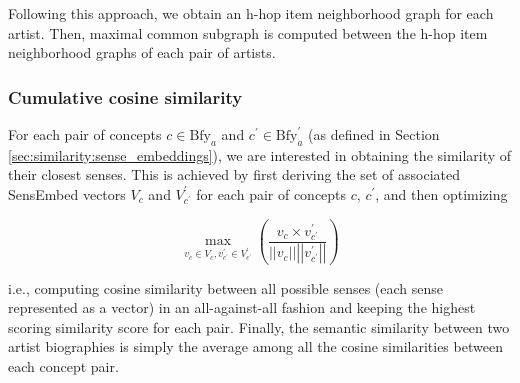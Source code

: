 Following this approach, we obtain an h-hop item neighborhood graph for each artist. Then, maximal common subgraph is computed between the h-hop item neighborhood graphs of each pair of artists. %

\subsubsection{Cumulative cosine similarity} %

For each pair of concepts $c \in \text{Bfy}_{a}$ and $c^{\prime} \in \text{Bfy}^{\prime}_{a}$ (as defined in Section \ref{sec:similarity:sense_embeddings}), we are interested in obtaining the similarity of their closest senses. This is achieved by first deriving the set of associated SensEmbed vectors $V_c$ and $V_{c^{\prime}}^{\prime}$ for each pair of concepts $c,\,c^{\prime}$, and then optimizing

\begin{equation}
\operatorname{max}_{v_c \in V_c , v_{c^{\prime}}^{\prime} \in V_{c^{\prime}}^{\prime}}
\left( \frac{v_c \times v_{c^{\prime}}^{\prime}}{\left\vert\left\vert{v_c}\right\vert\right\vert \left\vert\left\vert{v_{c^{\prime}}^{\prime}}\right\vert\right\vert } \right)
\end{equation}

i.e., computing cosine similarity between all possible senses (each sense represented as a vector) in an all-against-all fashion and keeping the highest scoring similarity score for each pair. Finally, the semantic similarity between two artist biographies is simply the average among all the cosine similarities between each concept pair.

